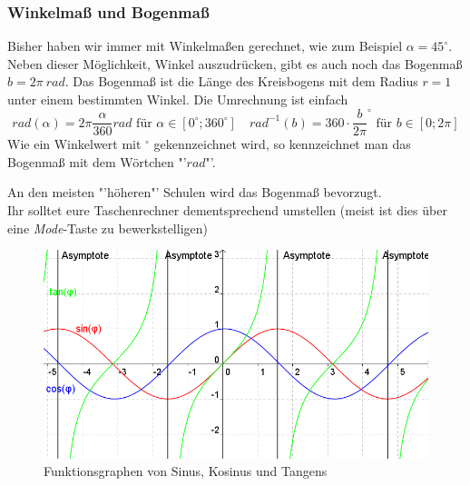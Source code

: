 \subsubsection{Winkelmaß und Bogenmaß}
Bisher haben wir immer mit Winkelmaßen gerechnet, wie zum Beispiel $\alpha = 45^\circ$. Neben dieser Möglichkeit, Winkel auszudrücken, gibt es auch noch das Bogenmaß $b = 2\pi \ rad$. Das Bogenmaß ist die Länge des Kreisbogens mit dem Radius $r = 1$ unter einem bestimmten Winkel. Die Umrechnung ist einfach
\begin{equation*}
rad(\alpha) = 2\pi \frac{\alpha}{360} rad \text{ für } \alpha \in \left[ 0^\circ;360^\circ \right] \quad rad^{-1}(b) = 360 \cdot {\frac{b}{2\pi}}^\circ \text{ für } b \in \left[0;2\pi\right]
\end{equation*}
Wie ein Winkelwert mit $^\circ$ gekennzeichnet wird, so kennzeichnet man das Bogenmaß mit dem Wörtchen "'$rad$"'.
\begin{warning}
	An den meisten "'höheren"' Schulen wird das Bogenmaß bevorzugt.\\
	Ihr solltet eure Taschenrechner dementsprechend umstellen (meist ist dies über eine \textit{Mode}-Taste zu bewerkstelligen)
\end{warning}

\begin{figure}[h!]
\includegraphics[width = 13 cm, height = 5 cm]{pictures/Winkelfunktionen}
\caption{Funktionsgraphen von Sinus, Kosinus und Tangens}
\end{figure}

